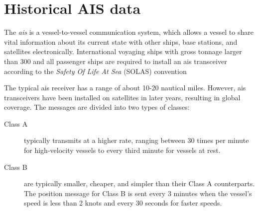 \chapter{Historical AIS data}\label{chap:ais}

The \textit{\acrfull{ais}} is a vessel-to-vessel communication system, which allows a vessel to share vital information about its current state with other ships, base stations, and satellites electronically. International voyaging ships with gross tonnage larger than 300 and all passenger ships are required to install an \acrshort{ais} transceiver according to the \textit{Safety Of Life At Sea} (SOLAS) convention \cite{ais_wiki} 

The typical \acrshort{ais} receiver has a range of about 10-20 nautical miles. However, \acrshort{ais} transceivers have been installed on satellites in later years, resulting in global coverage. The messages are divided into two types of classes:
\begin{description}
    \item[Class A] typically transmits at a higher rate, ranging between 30 times per minute for high-velocity vessels to every third minute for vessels at rest. 
    \item[Class B] are typically smaller, cheaper, and simpler than their Class A counterparts. The position message for Class B is sent every 3 minutes when the vessel's speed is less than 2 knots and every 30 seconds for faster speeds. 
\end{description}

